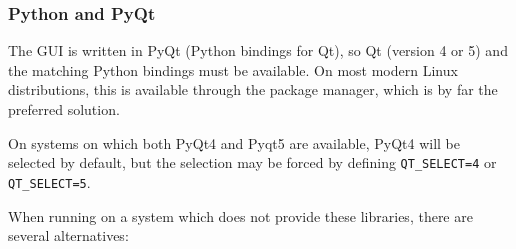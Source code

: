 \documentclass[a4paper,10pt,twoside]{csshortdoc}
\begin{document}
\subsubsection{Python and PyQt\label{sec:ext:python}}

The GUI is written in PyQt (Python bindings for Qt), so Qt (version 4 or 5)
and the matching Python bindings must be available. On most modern
Linux distributions, this is available through the package manager,
which is by far the preferred solution.

On systems on which both PyQt4 and Pyqt5 are available, PyQt4 will be selected
by default, but the selection may be forced by defining
\texttt{QT\_SELECT=4} or \texttt{QT\_SELECT=5}.

When running on a system which does
not provide these libraries, there are several alternatives:
\end{document}
